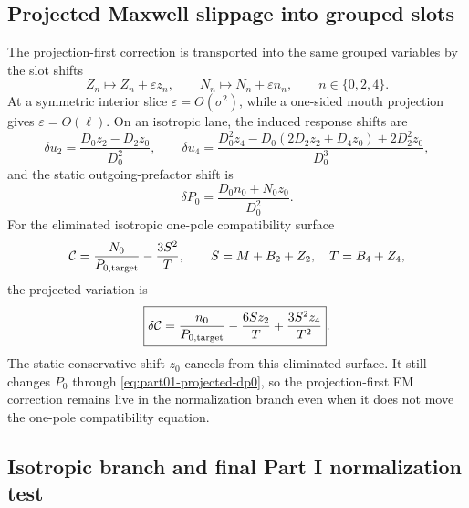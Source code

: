\subsection{Projected Maxwell slippage into grouped slots}
\label{subsec:part01-projected-maxwell-slippage}

The projection-first correction is transported into the same grouped variables
by the slot shifts
\begin{equation}
\label{eq:part01-projected-slot-shifts}
Z_n\mapsto Z_n+\varepsilon z_n,
\qquad
N_n\mapsto N_n+\varepsilon n_n,
\qquad
n\in\{0,2,4\}.
\end{equation}
At a symmetric interior slice \(\varepsilon=O(\sigma^2)\), while a one-sided
mouth projection gives \(\varepsilon=O(\ell)\).  On an isotropic lane, the
induced response shifts are
\begin{equation}
\label{eq:part01-projected-du2-du4}
\delta u_2=\frac{D_0z_2-D_2z_0}{D_0^2},
\qquad
\delta u_4=
\frac{D_0^2z_4-D_0(2D_2z_2+D_4z_0)+2D_2^2z_0}{D_0^3},
\end{equation}
and the static outgoing-prefactor shift is
\begin{equation}
\label{eq:part01-projected-dp0}
\delta P_0=\frac{D_0n_0+N_0z_0}{D_0^2}.
\end{equation}
For the eliminated isotropic one-pole compatibility surface
\begin{equation}
\mathcal C=\frac{N_0}{P_{0,\rm target}}-\frac{3S^2}{T},
\qquad
S=M+B_2+Z_2,\quad T=B_4+Z_4,
\end{equation}
the projected variation is
\begin{equation}
\label{eq:part01-projected-compatibility-variation}
\boxed{
\delta\mathcal C
=\frac{n_0}{P_{0,\rm target}}
-\frac{6Sz_2}{T}
+\frac{3S^2z_4}{T^2}}.
\end{equation}
The static conservative shift \(z_0\) cancels from this eliminated surface.
It still changes \(P_0\) through \eqref{eq:part01-projected-dp0}, so the
projection-first EM correction remains live in the normalization branch even
when it does not move the one-pole compatibility equation.

\subsection{Isotropic branch and final Part I normalization test}
\label{subsec:part01-isotropic-normalization-test}

